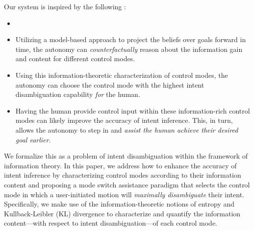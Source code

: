 \documentclass[letterpaper, 10 pt, conference]{ieeeconf}  %
\begin{document}
Our system is inspired by the following :
\begin{itemize}
	\item {}
	\item Utilizing a model-based approach to project the beliefs over goals forward in time, the autonomy can \textit{counterfactually} reason about the information gain and content for different control modes. 
	\item Using this information-theoretic characterization of control modes, the autonomy can choose the control mode with the highest intent disambiguation capability \textit{for} the human.
	\item Having the human provide control input within these information-rich control modes can likely improve the accuracy of intent inference. This, in turn, allows the autonomy to step in and \textit{assist the human achieve their desired goal earlier}. 
\end{itemize}


We formalize this as a problem of intent disambiguation within the framework of information theory. In this paper, we address how to enhance the accuracy of intent inference by characterizing control modes according to their information content and proposing a mode switch assistance paradigm that selects the control mode in which a user-initiated motion will \textit{maximally disambiguate} their intent. Specifically, we make use of the information-theoretic notions of entropy and Kullback-Leibler (KL) divergence to characterize and quantify the information content---with respect to intent disambiguation---of each control mode. 
\end{document}
